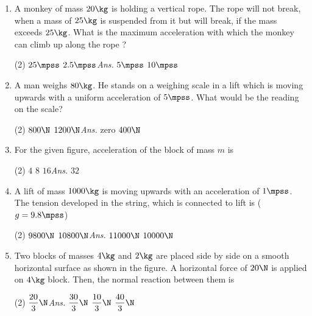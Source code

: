 \documentclass{article}
\newcommand{\ans}{\textcolor{red!95}{\textit{\quad Ans.}}}
\begin{document}
\begin{enumerate}
\item A monkey of mass $20\kg$ is holding a vertical rope. The rope will not break, when a mass of $25\kg$ is suspended from it but will break, if the mass exceeds $25\kg$. What is the maximum acceleration with which the monkey can climb up along the rope ?
\begin{tasks}(2)
	\task $25\mpss$
	\task $2.5\mpss$\ans
	\task $5\mpss$
	\task $10\mpss$
\end{tasks}

\item A man weighs $80\kg$. He stands on a weighing  scale in a lift which is moving upwards with a uniform acceleration of $5\mpss$. What would be the reading on the scale?
\begin{tasks}(2)
	\task $800\N$
	\task $1200\N$\ans
	\task zero
	\task $400\N$
\end{tasks}

\item For the given figure, acceleration of the block of mass $m$ is
	\begin{center}
	\end{center}
	\begin{tasks}(2)
		\task $4$
		\task $8$
		\task $16$\ans
		\task $32$
	\end{tasks}

\item A lift of mass $1000\kg$ is moving upwards with an acceleration of $1\mpss$. The tension developed in the string, which is connected to lift is ($g=9.8\mpss$)
\begin{tasks}(2)
	\task $9800\N$
	\task $10800\N$\ans
	\task $11000\N$
	\task $10000\N$
\end{tasks}

\item Two blocks of masses $4 \kg$ and $2 \kg$ are placed side by side on a smooth horizontal surface as shown in the figure. A horizontal force of $20 \N$ is applied on $4 \kg$ block. Then, the normal reaction between them is
\begin{center}
\end{center} 
\begin{tasks}(2)
	\task $\dfrac{20}{3}\N$\ans
	\task $\dfrac{30}{3}\N$
	\task $\dfrac{10}{3}\N$
	\task $\dfrac{40}{3}\N$
\end{tasks}

\end{enumerate}
\end{document}
